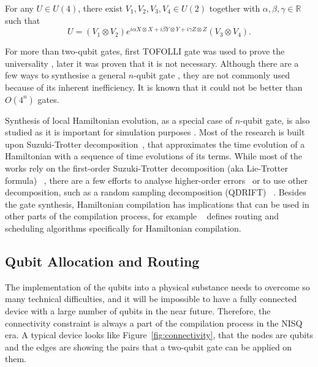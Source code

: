 \begin{lemma}\label{lem:kak_decomposition}
For any $U \in U(4)$, there exist $V_1, V_2, V_3, V_4 \in U(2)$ together with $\alpha, \beta, \gamma \in \mathbb{R}$ such that
\begin{equation}
  U = (V_1 \otimes V_2) e^{i\alpha X\otimes X + i\beta Y\otimes Y + i\gamma Z\otimes Z} (V_3 \otimes V_4).
  \end{equation}
\end{lemma}

For more than two-qubit gates, first TOFOLLI gate was used to prove the universality \cite{barenco1995}, later it was proven that it is not necessary. Although there are a few ways to synthesise a general $n$-qubit gate  \cite{sousa2006,shende2006}, they are not commonly used because of its inherent inefficiency. It is known that it could not be better than $O(4^n)$ gates. \cite{shende2006}

Synthesis of local Hamiltonian evolution, as a special case of $n$-qubit gate, is also studied as it is important for simulation purposes \cite{childs2018}. Most of the research is built upon Suzuki-Trotter decomposition~\cite{trotter1959, suzuki1991}, that approximates the time evolution of a Hamiltonian with a sequence of time evolutions of its terms. While most of the works rely on the first-order Suzuki-Trotter decomposition (aka Lie-Trotter formula) ~\cite{sivarajah2021, qiskit2023}, there are a few efforts to analyse higher-order errors~\cite{childs2021} or to use other decomposition, such as a random sampling decomposition (QDRIFT) ~\cite{campbell2019}. Besides the gate synthesis, Hamiltonian compilation has implications that can be used in other parts of the compilation process, for example ~\cite{lao2021} defines routing and scheduling algorithms specifically for Hamiltonian compilation.

\subsection{Qubit Allocation and Routing}

The implementation of the qubits into a physical substance needs to overcome so many technical difficulties, and it will be impossible to have a fully connected device with a large number of qubits in the near future. Therefore, the connectivity constraint is always a part of the compilation process in the NISQ era. A typical device looks like Figure~\ref{fig:connectivity}, that the nodes are qubits and the edges are showing the pairs that a two-qubit gate can be applied on them.

